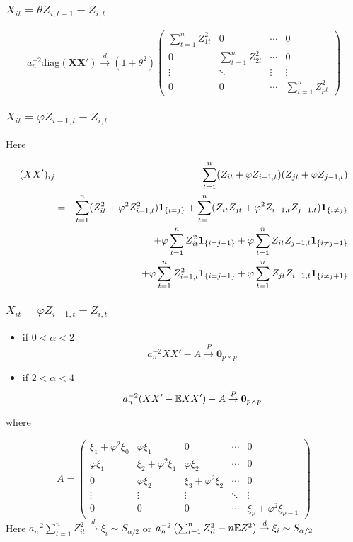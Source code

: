 \documentclass{beamer}
\begin{document}
\begin{frame}
  \frametitle{$X_{it} = \theta Z_{i, t-1} + Z_{i, t}$}
  $$
  a_n^{-2}\text{diag}(\mathbf{XX'}) \overset{d}{\to} (1+\theta^2)
  \begin{pmatrix}
    \sum_{t=1}^n Z_{1t}^2 & 0 & \cdots & 0 \\
    0 & \sum_{t=1}^n Z_{2t}^2 & \cdots & 0 \\
    \vdots & \ddots & \vdots & \vdots \\
    0 & 0 & \cdots & \sum_{t=1}^n Z_{pt}^2
  \end{pmatrix}
  $$
\end{frame}

\begin{frame}
  \frametitle{$X_{it} = \varphi Z_{i-1, t} + Z_{i,t}$}
  Here
  \begin{footnotesize}
    \begin{eqnarray*}
      (XX')_{ij} &=& \sum_{t=1}^n (Z_{it} + \varphi Z_{i-1,t})(Z_{jt} +
      \varphi Z_{j-1,t}) \\
      &=& \sum_{t=1}^n (Z_{it}^2 + \varphi^2 Z_{i-1,t}^2)\mathbf{1}_{\{i=j\}}
      + \sum_{t=1}^n (Z_{it}Z_{jt}+\varphi^2 Z_{i-1,t}Z_{j-1,t})\mathbf{1}_{\{i\neq j\}}
      \\
      && + \varphi \sum_{t=1}^n Z_{it}^2 \mathbf{1}_{\{i=j-1\}} 
      +\varphi\sum_{t=1}^n Z_{it} Z_{j-1,t}\mathbf{1}_{\{i\neq j-1\}} \\
      && + \varphi \sum_{t=1}^n Z_{i-1,t}^2 \mathbf{1}_{\{i=j+1\}} 
      +\varphi\sum_{t=1}^n Z_{jt} Z_{i-1,t}\mathbf{1}_{\{i\neq j+1\}} \\
    \end{eqnarray*}
  \end{footnotesize}
\end{frame}

\begin{frame}
  \frametitle{$X_{it} = \varphi Z_{i-1, t} + Z_{i,t}$}
  \begin{itemize}
  \item if $0 < \alpha < 2$
    \[
    a_n^{-2} XX' - A \overset{P}{\to} \mathbf 0_ {p\times p}
    \]
  \item if $2 < \alpha < 4$
    \[
    a_n^{-2} (XX' - \mathbb{E} XX' )- A \overset{P}{\to} \mathbf 0_ {p\times p}
    \]
  \end{itemize}
  where
  \begin{footnotesize}
    \[
    A =
    \begin{pmatrix}
      \xi_1 + \varphi^2 \xi_0 & \varphi \xi_1 & 0 & \cdots & 0 \\
      \varphi \xi_1 & \xi_2 + \varphi^2 \xi_1 & \varphi \xi_2 & \cdots & 0 \\
      0 & \varphi \xi_2 & \xi_3 + \varphi^2 \xi_2 & \cdots & 0 \\
      \vdots & \vdots & \vdots & \ddots & \vdots \\
      0 & 0 & 0 & \cdots & \xi_p + \varphi^2 \xi_{p-1}
    \end{pmatrix}
    \]
    Here $a_n^{-2}\sum_{t=1}^n Z_{it}^2 \overset{d}{\to} \xi_i \sim
    S_{\alpha/2}$ or $a_n^{-2}\left(\sum_{t=1}^n Z_{it}^2 - n \mathbb{E}
      Z^2\right) \overset{d}{\to} \xi_i \sim S_{\alpha/2}$
  \end{footnotesize}
\end{frame}
\end{document}
